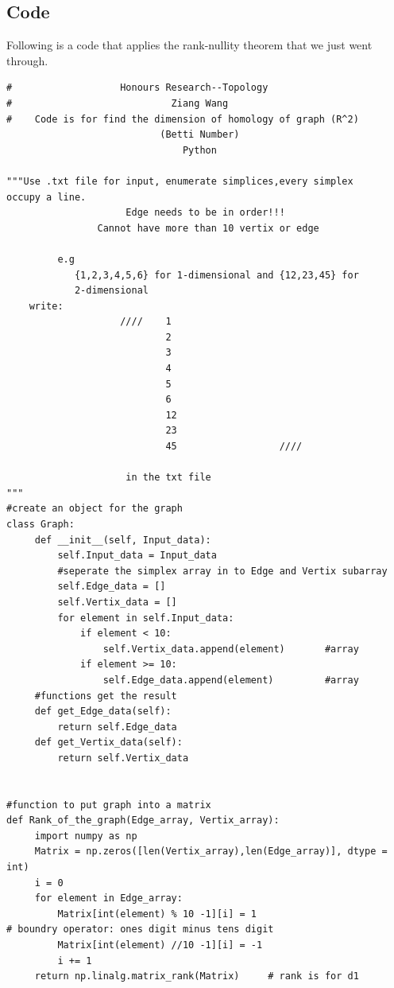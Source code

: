 \documentclass[12pt,letterpaper]{article}
\begin{document}
\begin{normalsize}
\subsection{Code}
\hspace{5mm} Following is a code that applies the rank-nullity theorem that we just went through.
\begin{verbatim}
#                   Honours Research--Topology   
#                            Ziang Wang
#    Code is for find the dimension of homology of graph (R^2) 
                           (Betti Number)
                               Python

"""Use .txt file for input, enumerate simplices,every simplex 
occupy a line. 
                     Edge needs to be in order!!!
                Cannot have more than 10 vertix or edge

         e.g
            {1,2,3,4,5,6} for 1-dimensional and {12,23,45} for 
            2-dimensional 
    write:
                    ////    1
                            2
                            3
                            4
                            5
                            6
                            12
                            23
                            45                  ////

                     in the txt file
"""
#create an object for the graph 
class Graph: 
     def __init__(self, Input_data):
         self.Input_data = Input_data
         #seperate the simplex array in to Edge and Vertix subarray
         self.Edge_data = []
         self.Vertix_data = []
         for element in self.Input_data:
             if element < 10:
                 self.Vertix_data.append(element)       #array
             if element >= 10:
                 self.Edge_data.append(element)         #array
     #functions get the result
     def get_Edge_data(self):
         return self.Edge_data 
     def get_Vertix_data(self):
         return self.Vertix_data

  
#function to put graph into a matrix
def Rank_of_the_graph(Edge_array, Vertix_array):
     import numpy as np
     Matrix = np.zeros([len(Vertix_array),len(Edge_array)], dtype = int)
     i = 0
     for element in Edge_array:
         Matrix[int(element) % 10 -1][i] = 1     
# boundry operator: ones digit minus tens digit
         Matrix[int(element) //10 -1][i] = -1     
         i += 1
     return np.linalg.matrix_rank(Matrix)     # rank is for d1


\end{verbatim}
\end{normalsize}
\end{document}
